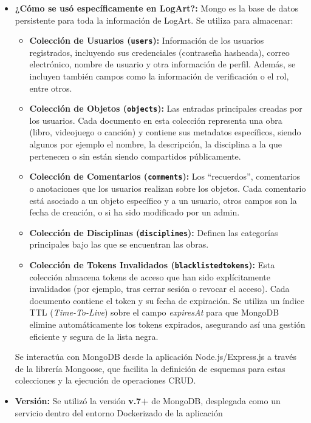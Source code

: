 \begin{itemize}
\begin{itemize}
            \item \textit{Comunidad y Ecosistema:} MongoDB cuenta con una amplia comunidad, extensiva documentación y herramientas de desarrollo como las ya mencionadas anteriormente (MongoDB Compass y Atlas) que facilitan su uso.
        \end{itemize}
    \item \textbf{¿Cómo se usó específicamente en LogArt?:}
    Mongo es la base de datos persistente para toda la información de LogArt. Se utiliza para almacenar:
        \begin{itemize}
            \item \textbf{Colección de Usuarios (\texttt{users}):} Información de los usuarios registrados, incluyendo sus credenciales (contraseña hasheada), correo electrónico, nombre de usuario y otra información de perfil. Además, se incluyen también campos como la información de verificación o el rol, entre otros.
            \item \textbf{Colección de Objetos (\texttt{objects}):} Las entradas principales creadas por los usuarios. Cada documento en esta colección representa una obra (libro, videojuego o canción) y contiene sus metadatos específicos, siendo algunos por ejemplo el nombre, la descripción, la disciplina a la que pertenecen o sin están siendo compartidos públicamente.
            \item \textbf{Colección de Comentarios (\texttt{comments}):} Los ``recuerdos'', comentarios o anotaciones que los usuarios realizan sobre los objetos. Cada comentario está asociado a un objeto específico y a un usuario, otros campos son la fecha de creación, o si ha sido modificado por un admin.
            \item \textbf{Colección de Disciplinas (\texttt{disciplines}):} Definen las categorías principales bajo las que se encuentran las obras.
            \item \textbf{Colección de Tokens Invalidados (\texttt{blacklistedtokens}):} Esta colección almacena tokens de acceso que han sido explícitamente invalidados (por ejemplo, tras cerrar sesión o revocar el acceso). Cada documento contiene el token y su fecha de expiración. Se utiliza un índice TTL (\textit{Time-To-Live}) sobre el campo \textit{expiresAt} para que MongoDB elimine automáticamente los tokens expirados, asegurando así una gestión eficiente y segura de la lista negra.
        \end{itemize}
    Se interactúa con MongoDB desde la aplicación Node.js/Express.js a través de la librería Mongoose, que facilita la definición de esquemas para estas colecciones y la ejecución de operaciones CRUD.
    \item \textbf{Versión:} Se utilizó la versión \textbf{v.7+} de MongoDB, desplegada como un servicio dentro del entorno Dockerizado de la aplicación
\end{itemize}

